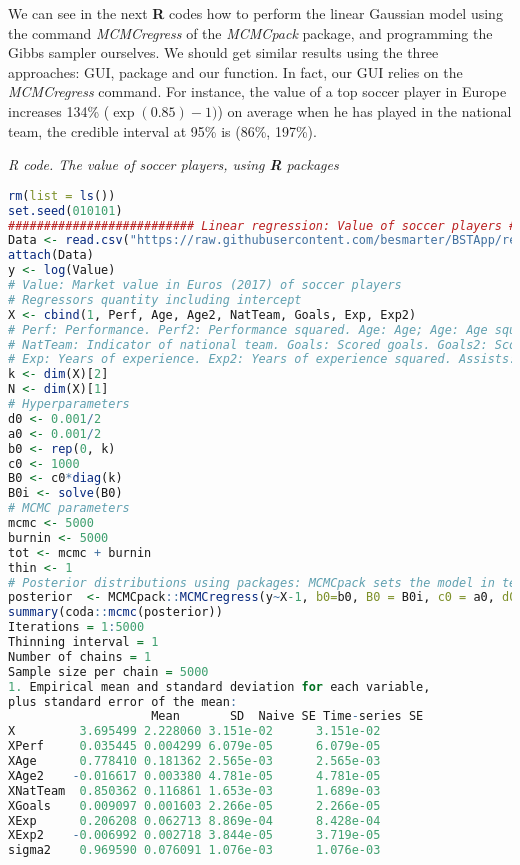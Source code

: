 We can see in the next \textbf{R} codes how to perform the linear Gaussian model using the command \textit{MCMCregress} of the \textit{MCMCpack} package, and programming the Gibbs sampler ourselves. We should get similar results using the three approaches: GUI, package and our function. In fact, our GUI relies on the \textit{MCMCregress} command. For instance, the value of a top soccer player in Europe increases 134\% ($\exp(0.85)-1)$) on average when he has played in the national team, the credible interval at 95\% is (86\%, 197\%).  


\begin{tcolorbox}[enhanced,width=4.67in,center upper,
	fontupper=\large\bfseries,drop shadow southwest,sharp corners]\label{code1}
	\textit{R code. The value of soccer players, using \textbf{R} packages}
	\begin{VF}
		\begin{lstlisting}[language=R]		
rm(list = ls())
set.seed(010101)
########################## Linear regression: Value of soccer players ##########################
Data <- read.csv("https://raw.githubusercontent.com/besmarter/BSTApp/refs/heads/master/DataApp/1ValueFootballPlayers.csv", sep = ",", header = TRUE, quote = "")
attach(Data)
y <- log(Value) 
# Value: Market value in Euros (2017) of soccer players
# Regressors quantity including intercept
X <- cbind(1, Perf, Age, Age2, NatTeam, Goals, Exp, Exp2)
# Perf: Performance. Perf2: Performance squared. Age: Age; Age: Age squared. 
# NatTeam: Indicator of national team. Goals: Scored goals. Goals2: Scored goals squared
# Exp: Years of experience. Exp2: Years of experience squared. Assists: Number of assists
k <- dim(X)[2]
N <- dim(X)[1]
# Hyperparameters
d0 <- 0.001/2
a0 <- 0.001/2
b0 <- rep(0, k)
c0 <- 1000
B0 <- c0*diag(k)
B0i <- solve(B0)
# MCMC parameters
mcmc <- 5000
burnin <- 5000
tot <- mcmc + burnin
thin <- 1
# Posterior distributions using packages: MCMCpack sets the model in terms of the precision matrix
posterior  <- MCMCpack::MCMCregress(y~X-1, b0=b0, B0 = B0i, c0 = a0, d0 = d0, burnin = burnin, mcmc = mcmc, thin = thin)
summary(coda::mcmc(posterior))
Iterations = 1:5000
Thinning interval = 1 
Number of chains = 1 
Sample size per chain = 5000 
1. Empirical mean and standard deviation for each variable,
plus standard error of the mean:
					Mean       SD  Naive SE Time-series SE
X         3.695499 2.228060 3.151e-02      3.151e-02
XPerf     0.035445 0.004299 6.079e-05      6.079e-05
XAge      0.778410 0.181362 2.565e-03      2.565e-03
XAge2    -0.016617 0.003380 4.781e-05      4.781e-05
XNatTeam  0.850362 0.116861 1.653e-03      1.689e-03
XGoals    0.009097 0.001603 2.266e-05      2.266e-05
XExp      0.206208 0.062713 8.869e-04      8.428e-04
XExp2    -0.006992 0.002718 3.844e-05      3.719e-05
sigma2    0.969590 0.076091 1.076e-03      1.076e-03
\end{lstlisting}
	\end{VF}
\end{tcolorbox} 


